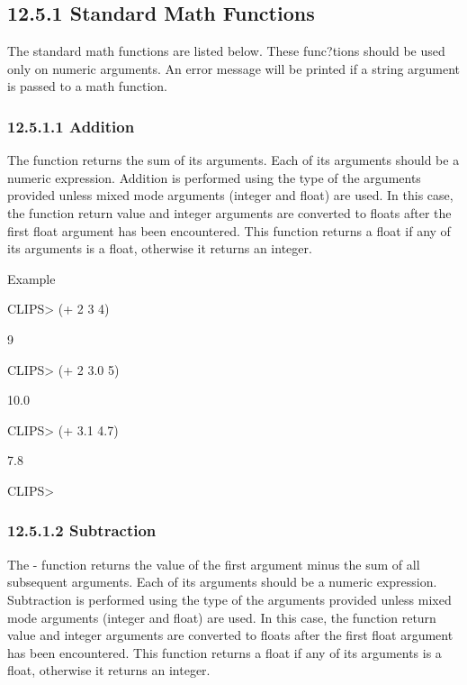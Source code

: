 \documentclass[letterpaper,10pt,english]{sphinxmanual}
\begin{document}
\subsection{12.5.1 Standard Math Functions}
\label{\detokenize{actions:standard-math-functions}}
The standard math functions are listed below. These func?tions should be
used only on numeric arguments. An error message will be printed if a
string argument is passed to a math function.


\subsubsection{12.5.1.1 Addition}
\label{\detokenize{actions:addition}}
The \sphinxstylestrong{+} function returns the sum of its arguments. Each of its
arguments should be a numeric expression. Addition is performed using
the type of the arguments provided unless mixed mode arguments (integer
and float) are used. In this case, the function return value and integer
arguments are converted to floats after the first float argument has
been encountered. This function returns a float if any of its arguments
is a float, otherwise it returns an integer.


\begin{sphinxVerbatim}[commandchars=\\\{\}]
  
\end{sphinxVerbatim}

Example

CLIPS\textgreater{} (+ 2 3 4)

9

CLIPS\textgreater{} (+ 2 3.0 5)

10.0

CLIPS\textgreater{} (+ 3.1 4.7)

7.8

CLIPS\textgreater{}


\subsubsection{12.5.1.2 Subtraction}
\label{\detokenize{actions:subtraction}}
The \sphinxstylestrong{-}- function returns the value of the first argument minus the
sum of all subsequent arguments. Each of its arguments should be a
numeric expression. Subtraction is performed using the type of the
arguments provided unless mixed mode arguments (integer and float) are
used. In this case, the function return value and integer arguments are
converted to floats after the first float argument has been encountered.
This function returns a float if any of its arguments is a float,
otherwise it returns an integer.
\end{document}
